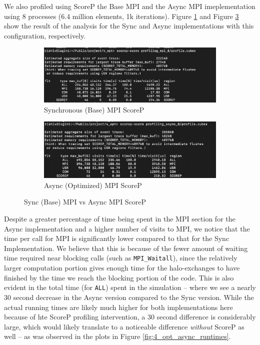 \documentclass[a4paper,10pt]{article}
\begin{document}
We also profiled using ScoreP the Base MPI and the Async MPI imeplementation using 8 processes (6.4 million elements, 1k iterations). Figure \ref{fig:4_opt_scorep_sync} and Figure \ref{fig:4_opt_scorep_async} show the result of the analysis for the Sync and Async implementations with this configuration, respectively.  
\begin{figure}[H]
     \centering
     \begin{subfigure}[b]{0.45\textwidth}
         \centering
         \includegraphics[width=\textwidth]{../images/4_opt/scorep_8_mpi.png}
         \caption{Synchronous (Base) MPI ScoreP}
         \label{fig:4_opt_scorep_sync}
     \end{subfigure}
     \hfill
     \begin{subfigure}[b]{0.45\textwidth}
         \centering
         \includegraphics[width=\textwidth]{../images/4_opt/scorep_8_async.png}
         \caption{Async (Optimized) MPI ScoreP}
         \label{fig:4_opt_scorep_async}
     \end{subfigure}
     \caption{Sync (Base) MPI vs Async MPI ScoreP}
\end{figure}

Despite a greater percentage of time being spent in the MPI section for the Async implementation and a higher number of visits to MPI, we notice that the time per call for MPI is significantly lower compared to that for the Sync Implementation. We believe that this is because of the fewer amount of waiting time required near blocking calls (such as \verb|MPI_Waitall|), since the relatively larger computation portion gives enough time for the halo-exchanges to have finished by the time we reach the blocking portion of the code. This is also evident in the total time (for \verb|ALL|) spent in the simulation -- where we see a nearly 30 second decrease in the Async version compared to the Sync version. While the actual running times are likely much higher for both implementations here because of hte ScoreP profiling intervention, a 30 second difference is considerably large, which would likely translate to a noticeable difference \textit{without} ScoreP as well -- as was observed in the plots in Figure \ref{fig:4_opt_async_runtimes}.
\end{document}
